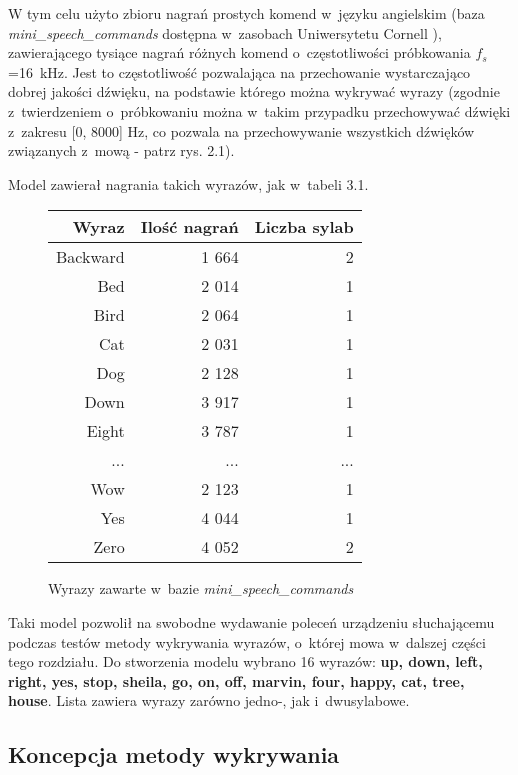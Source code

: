 W tym celu użyto zbioru nagrań prostych komend w~języku angielskim (baza \textit{mini\_speech\_commands} dostępna w~zasobach Uniwersytetu Cornell \cite{Baza:Mowa}), zawierającego tysiące nagrań różnych komend o~częstotliwości próbkowania $f_s$ =16~kHz. Jest to częstotliwość pozwalająca na przechowanie wystarczająco dobrej jakości dźwięku, na podstawie którego można wykrywać wyrazy (zgodnie z~twierdzeniem o~próbkowaniu można w~takim przypadku przechowywać dźwięki z~zakresu [0, 8000] Hz, co pozwala na przechowywanie wszystkich dźwięków związanych z~mową - patrz rys. 2.1).

Model zawierał nagrania takich wyrazów, jak w~tabeli 3.1.

\begin{figure}[h]
	\centering
	\begin{tabular}{|r|r|r|}
		\hline
		Wyraz & Ilość nagrań & Liczba sylab\\
		\hline
		Backward & 1 664 & 2\\
		Bed 	 & 2 014 & 1\\
		Bird 	 & 2 064 & 1\\
		Cat 	 & 2 031 & 1\\
		Dog 	 & 2 128 & 1\\
		Down 	 & 3 917 & 1\\
		Eight 	 & 3 787 & 1\\
		... & ... & ...\\
		Wow & 2 123 & 1 \\
		Yes & 4 044 & 1 \\
		Zero & 4 052 & 2\\
		
		\hline
	\end{tabular}
	\caption{Wyrazy zawarte w~bazie \textit{mini\_speech\_commands} \cite{Baza:Mowa}}
\end{figure}
\FloatBarrier %

Taki model pozwolił na swobodne wydawanie poleceń urządzeniu słuchającemu podczas testów metody wykrywania wyrazów, o~której mowa w~dalszej części tego rozdziału. Do stworzenia modelu wybrano 16 wyrazów: \textbf{up, down, left, right, yes, stop, sheila, go, on, off, marvin, four, happy, cat, tree, house}. Lista zawiera wyrazy zarówno jedno-, jak i~dwusylabowe.

\subsection{Koncepcja metody wykrywania }

